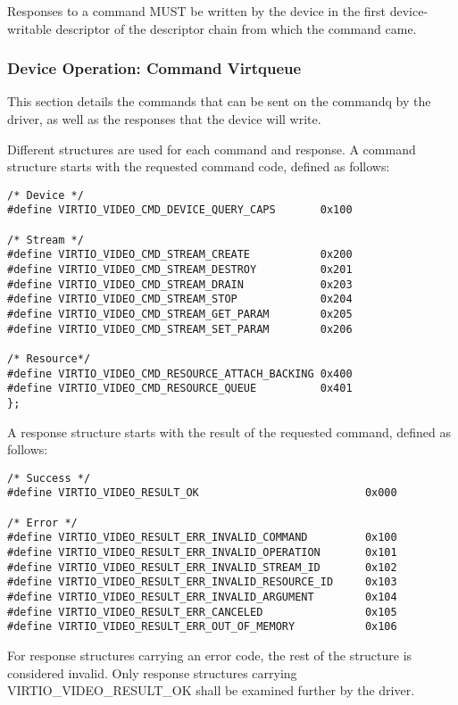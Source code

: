 Responses to a command MUST be written by the device in the first
device-writable descriptor of the descriptor chain from which the
command came.

\subsubsection{Device Operation: Command Virtqueue}\label{sec:Device Types / Video Device / Device Operation / Device Operation: Command Virtqueue}

This section details the commands that can be sent on the commandq by
the driver, as well as the responses that the device will write.

Different structures are used for each command and response. A command
structure starts with the requested command code, defined as follows:

\begin{lstlisting}
/* Device */
#define VIRTIO_VIDEO_CMD_DEVICE_QUERY_CAPS       0x100

/* Stream */
#define VIRTIO_VIDEO_CMD_STREAM_CREATE           0x200
#define VIRTIO_VIDEO_CMD_STREAM_DESTROY          0x201
#define VIRTIO_VIDEO_CMD_STREAM_DRAIN            0x203
#define VIRTIO_VIDEO_CMD_STREAM_STOP             0x204
#define VIRTIO_VIDEO_CMD_STREAM_GET_PARAM        0x205
#define VIRTIO_VIDEO_CMD_STREAM_SET_PARAM        0x206

/* Resource*/
#define VIRTIO_VIDEO_CMD_RESOURCE_ATTACH_BACKING 0x400
#define VIRTIO_VIDEO_CMD_RESOURCE_QUEUE          0x401
};
\end{lstlisting}

A response structure starts with the result of the requested command,
defined as follows:

\begin{lstlisting}
/* Success */
#define VIRTIO_VIDEO_RESULT_OK                          0x000

/* Error */
#define VIRTIO_VIDEO_RESULT_ERR_INVALID_COMMAND         0x100
#define VIRTIO_VIDEO_RESULT_ERR_INVALID_OPERATION       0x101
#define VIRTIO_VIDEO_RESULT_ERR_INVALID_STREAM_ID       0x102
#define VIRTIO_VIDEO_RESULT_ERR_INVALID_RESOURCE_ID     0x103
#define VIRTIO_VIDEO_RESULT_ERR_INVALID_ARGUMENT        0x104
#define VIRTIO_VIDEO_RESULT_ERR_CANCELED                0x105
#define VIRTIO_VIDEO_RESULT_ERR_OUT_OF_MEMORY           0x106
\end{lstlisting}

For response structures carrying an error code, the rest of the
structure is considered invalid. Only response structures carrying
VIRTIO\_VIDEO\_RESULT\_OK shall be examined further by the driver.

